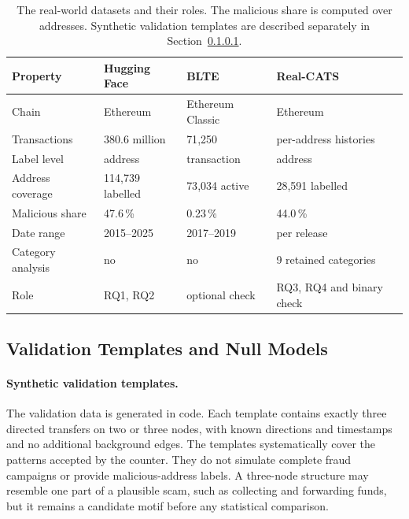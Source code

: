 \documentclass{thesisclass}
\begin{document}
\begin{table}[ht]
\centering
\caption{The real-world datasets and their roles. The malicious share is
computed over addresses. Synthetic validation templates are described
separately in Section~\ref{sec:dataset_synthetic}.}
\label{tab:dataset_comparison}
\small
\setlength{\tabcolsep}{4pt}
\begin{tabular}{@{}p{3.1cm} p{3.1cm} p{3.0cm} p{3.2cm}@{}}
\toprule
\textbf{Property} & \textbf{Hugging Face} & \textbf{BLTE} & \textbf{Real-CATS} \\
\midrule
Chain              & Ethereum      & Ethereum Classic & Ethereum \\
Transactions       & 380.6 million & 71{,}250         & per-address histories \\
Label level        & address       & transaction      & address \\
Address coverage   & 114{,}739 labelled & 73{,}034 active & 28{,}591 labelled \\
Malicious share    & 47.6\,\%      & 0.23\,\%         & 44.0\,\% \\
Date range         & 2015--2025    & 2017--2019       & per release \\
Category analysis  & no            & no               & 9 retained categories \\
Role               & RQ1, RQ2      & optional check   & RQ3, RQ4 and binary check \\
\bottomrule
\end{tabular}
\end{table}

\subsection{Validation Templates and Null Models}
\label{sec:validation_and_null_models}

\paragraph{Synthetic validation templates.}
\label{sec:dataset_synthetic}
The validation data is generated in code. Each template contains exactly three
directed transfers on two or three nodes, with known directions and timestamps
and no additional background edges. The templates systematically cover the
patterns accepted by the counter. They do not simulate complete fraud campaigns
or provide malicious-address labels. A three-node structure may resemble one
part of a plausible scam, such as collecting and forwarding funds, but it
remains a candidate motif before any statistical comparison.
\end{document}
